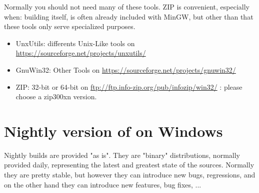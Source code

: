 Normally you should not need many of these tools. ZIP is convenient, especially when: building \codeblocks itself, is often already included with MinGW, but other than that these tools only serve specialized purposes.
\begin{itemize}
\item UnxUtils: differents Unix-Like tools on \url{https://sourceforge.net/projects/unxutils/}
\item GnuWin32: Other Tools on \url{https://sourceforge.net/projects/gnuwin32/}
\item ZIP: 32-bit or 64-bit on \url{ftp://ftp.info-zip.org/pub/infozip/win32/} : please choose a zip300xn version.
\end{itemize}

\section{Nightly version of \codeblocks on Windows}

Nightly builds are provided "as is". They are "binary" distributions, normally provided daily, representing the latest and greatest state of the \codeblocks sources. Normally they are pretty stable, but however they can introduce new bugs, regressions, and on the other hand they can introduce new features, bug fixes, ...

